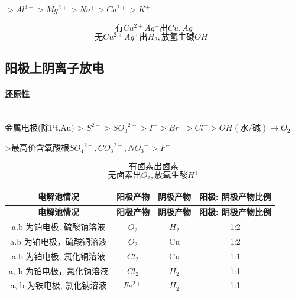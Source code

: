 \documentclass[10pt,cn]{elegantbook}
\begin{document}
$>Al^{3+} > Mg^{2+} > Na^{+} > Ca^{2+} > K^{+}$

\[\text{有}Cu^{2+} Ag^{+} \text{出}Cu,Ag\]
\[\text{无}Cu^{2+} Ag^{+} \text{出}H_{2},\text{放氢生碱}OH^{-}\]

\subsection{阳极上阴离子放电}

\paragraph*{还原性}~{}\\
	
	金属电极(除Pt,Au) > $S^{2-} > {SO_{3}}^{2-} > I^{-} > Br^{-} > Cl^{-} > OH^{}(\text{水/碱})\rightarrow O_{2}$
	
	
	>最高价含氧酸根${SO_{4}}^{2-},{CO_{3}}^{2-},{NO_{3}}^{-} > F^{-}$ 
	
	\[\text{有卤素出卤素}\]
	\[\text{无卤素出}O_{2},\text{放氧生酸}H^{+}\]
	
	
	
	\begin{longtable}{|c|c|c|c|} 
		
		\hline %
		
		\textbf{电解池情况} & \textbf{阳极产物} & \textbf{阴极产物} & \textbf{阳极: 阴极产物比例} \\ %
		\hline %
		\endfirsthead %
		
		\hline %
		\textbf{电解池情况} & \textbf{阳极产物} & \textbf{阴极产物} & \textbf{阳极: 阴极产物比例} \\ %
		\hline %
		\endhead %
		
		\hline
		\endfoot %
		
		\hline
		\endlastfoot %
		
		a.b 为铂电极, 硫酸钠溶液 & $O_{2}$ & $H_{2}$ & 1:2 \\ %
		\hline %
		a.b 为铂电极，硫酸铜溶液 & $O_{2}$ & Cu & 1:2 \\ %
		\hline
		a.b 为铂电极, 氯化铜溶液 & $Cl_{2}$ & Cu & 1:1\\ %
		\hline
		a, b 为铂电极，氯化钠溶液 & $Cl_{2}$ & $H_{2}$ & 1:1 \\ %
		\hline
		a, b 为铁电极, 氯化钠溶液 & $Fe^{2+}$ & $H_{2}$ & 1:1 \\ %
		\hline
		
	\end{longtable} %
	
\end{document}
